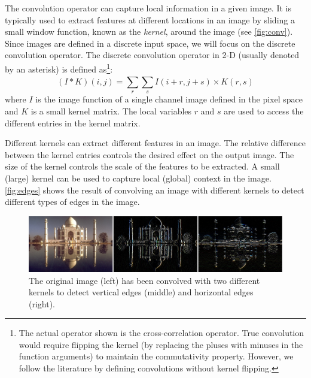 The convolution operator can capture local information in a given image. It is typically used to extract features at different locations in an image by sliding a small window function, known as the \emph{kernel}, around the image (see \autoref{fig:conv}). Since images are defined in a discrete input space, we will focus on the discrete convolution operator. The discrete convolution operator in 2-D (usually denoted by an asterisk) is defined as\footnote{The actual operator shown is the cross-correlation operator. True convolution would require flipping the kernel (by replacing the pluses with minuses in the function arguments) to maintain the commutativity property. However, we follow the literature by defining convolutions without kernel flipping.}:
\begin{equation}
    (I * K)(i, j) = \sum^{}_{r}{\sum^{}_{s}{I(i+r, j+s) \times K(r, s)}}
\end{equation}
where $I$ is the image function of a single channel image defined in the pixel space and $K$ is a small kernel matrix. The local variables $r$ and $s$ are used to access the different entries in the kernel matrix.

Different kernels can extract different features in an image. The relative difference between the kernel entries controls the desired effect on the output image. The size of the kernel controls the scale of the features to be extracted. A small (large) kernel can be used to capture local (global) context in the image.
\autoref{fig:edges} shows the result of convolving an image with different kernels to detect different types of edges in the image.

\begin{figure}[thbp]
    \centering
    \includegraphics[width=\textwidth]{figures/sobel.pdf}
    \caption{The original image (left) has been convolved with two different kernels to detect vertical edges (middle) and horizontal edges (right).}
    \label{fig:edges}
\end{figure}

